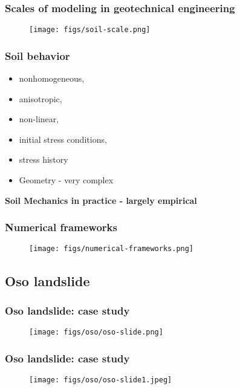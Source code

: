 \documentclass[handout]{beamer}
\begin{document}
\begin{frame}
\frametitle{Scales of modeling in geotechnical engineering}
	\begin{figure}
		\texttt{[image: figs/soil-scale.png]}
	\end{figure}
\end{frame}

\begin{frame}
\frametitle{Soil behavior}
\begin{itemize}
	\item nonhomogeneous,
	\item anisotropic, 
	\item non-linear, 
	\item initial stress conditions, 
	\item stress history
	\item Geometry - very complex
\end{itemize}
\textbf{Soil Mechanics in practice - largely empirical}
\end{frame}


\begin{frame}
	\frametitle{Numerical frameworks}
	\begin{figure}
		\texttt{[image: figs/numerical-frameworks.png]}
	\end{figure}
\end{frame}

\subsection{Oso landslide}
\begin{frame}
	\frametitle{Oso landslide: case study}
	\begin{figure}
		\texttt{[image: figs/oso/oso-slide.png]}
	\end{figure}
\end{frame}

\begin{frame}
	\frametitle{Oso landslide: case study}
	\begin{figure}
		\texttt{[image: figs/oso/oso-slide1.jpeg]}
	\end{figure}
\end{frame}
\end{document}
